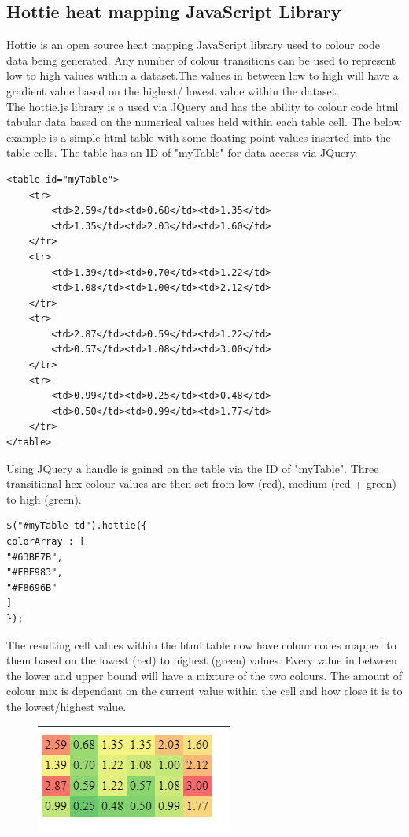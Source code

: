 \subsection{Hottie heat mapping JavaScript Library}
Hottie is an open source heat mapping JavaScript library used to colour code data being generated. Any number of colour transitions can be used to represent low to high values within a dataset.The values in between low to high will have a gradient value based on the highest/ lowest value within the dataset.~\cite{HeatMap:online}\\
The hottie.js library is a used via JQuery and has the ability to colour code html tabular data based on the numerical values held within each table cell. The below example is a simple html table with some floating point values inserted into the table cells. The table has an ID of "myTable" for data access via JQuery.~\cite{HottieExample:online}
\begin{verbatim}
<table id="myTable">
	<tr>
		<td>2.59</td><td>0.68</td><td>1.35</td>
		<td>1.35</td><td>2.03</td><td>1.60</td>
	</tr>
	<tr>
		<td>1.39</td><td>0.70</td><td>1.22</td>
		<td>1.08</td><td>1.00</td><td>2.12</td>
	</tr>
	<tr>
		<td>2.87</td><td>0.59</td><td>1.22</td>
		<td>0.57</td><td>1.08</td><td>3.00</td>
	</tr>
	<tr>
		<td>0.99</td><td>0.25</td><td>0.48</td>
		<td>0.50</td><td>0.99</td><td>1.77</td>
	</tr>
</table>
\end{verbatim}
Using JQuery a handle is gained on the table via the ID of "myTable". Three transitional hex colour values are then set from low (red), medium (red + green) to high (green).~\cite{HottieExample:online}
\begin{verbatim}
$("#myTable td").hottie({
colorArray : [ 
"#63BE7B",
"#FBE983",
"#F8696B"
]
});
\end{verbatim}
The resulting cell values within the html table now have colour codes mapped to them based on the lowest (red) to highest (green) values. Every value in between the lower and upper bound will have a mixture of the two colours. The amount of colour mix is dependant on the current value within the cell and how close it is to the lowest/highest value.~\cite{HeatMap:online}~\cite{HottieExample:online}\\
\begin{figure}[H]
	\centering
	\includegraphics[width=0.7\linewidth]{img/HeatMap}
	\caption{}
	\label{fig:heatmap result}
\end{figure}

